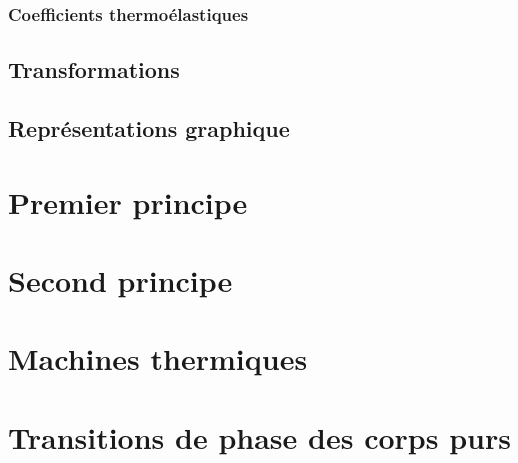 \subsection{Coefficients thermoélastiques}
\section{Transformations}
\section{Représentations graphique}
\chapter{Premier principe}
\chapter{Second principe}
\chapter{Machines thermiques}
\chapter{Transitions de phase des corps purs}